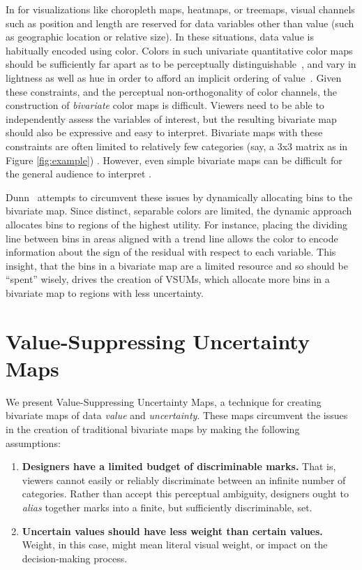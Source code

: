 \documentclass{vgtc}                          %
\begin{document}
In for visualizations like choropleth maps, heatmaps, or treemaps, visual channels such as position and length are reserved for data variables other than value (such as geographic location or relative size). In these situations, data value is habitually encoded using color. Colors in such univariate quantitative color maps should be sufficiently far apart as to be perceptually distinguishable~\cite{ware1988color}, and vary in lightness as well as hue in order to afford an implicit ordering of value~\cite{borland2007rainbow,rogowitz2001blair}. Given these constraints, and the perceptual non-orthogonality of color channels, the construction of \emph{bivariate} color maps is difficult. Viewers need to be able to independently assess the variables of interest, but the resulting bivariate map should also be expressive and easy to interpret. Bivariate maps with these constraints are often limited to relatively few categories (say, a 3x3 matrix as in Figure \ref{fig:example}) \cite{robertson1986generation,trumbo1981theory}. However, even simple bivariate maps can be difficult for the general audience to interpret \cite{wainer1980empirical}.


Dunn~\cite{dunn1989dynamic} attempts to circumvent these issues by dynamically allocating bins to the bivariate map. Since distinct, separable colors are limited, the dynamic approach allocates bins to regions of the highest utility. For instance, placing the dividing line between bins in areas aligned with a trend line allows the color to encode information about the sign of the residual with respect to each variable. This insight, that the bins in a bivariate map are a limited resource and so should be ``spent'' wisely, drives the creation of VSUMs, which allocate more bins in a bivariate map to regions with less uncertainty. 


\section{Value-Suppressing Uncertainty Maps}

We present Value-Suppressing Uncertainty Maps, a technique for creating bivariate maps of data \emph{value} and \emph{uncertainty}. These maps circumvent the issues in the creation of traditional bivariate maps by making the following assumptions:

\begin{enumerate}
	\item \textbf{Designers have a limited budget of discriminable marks.} That is, viewers cannot easily or reliably discriminate between an infinite number of categories. Rather than accept this perceptual ambiguity, designers ought to \emph{alias} together marks into a finite, but sufficiently discriminable, set.
	\item \textbf{Uncertain values should have less weight than certain values.} Weight, in this case, might mean literal visual weight, or impact on the decision-making process. 
\end{enumerate}
\end{document}
